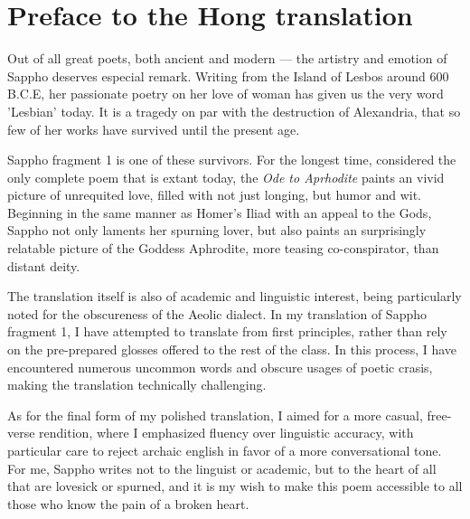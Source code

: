 \section*{Preface to the Hong translation}
Out of all great poets, both ancient and modern --- the artistry and emotion of Sappho deserves especial remark. Writing from the Island of Lesbos around 600 B.C.E, her passionate poetry on her love of woman has given us the very word 'Lesbian' today. It is a tragedy on par with the destruction of Alexandria, that so few of her works have survived until the present age.

Sappho fragment 1 is one of these survivors. For the longest time, considered the only complete poem that is extant today, the \emph{Ode to Aprhodite} paints an vivid picture of unrequited love, filled with not just longing, but humor and wit. Beginning in the same manner as Homer's Iliad with an appeal to the Gods, Sappho not only laments her spurning lover, but also paints an surprisingly relatable picture of the Goddess Aphrodite, more teasing co-conspirator, than distant deity.

The translation itself is also of academic and linguistic interest, being particularly noted for the obscureness of the Aeolic dialect. In my translation of Sappho fragment 1, I have attempted to translate from first principles, rather than rely on the pre-prepared glosses offered to the rest of the class. In this process, I have encountered numerous uncommon words and obscure usages of poetic crasis, making the translation technically challenging.

As for the final form of my polished translation, I aimed for a more casual, free-verse rendition, where I emphasized fluency over linguistic accuracy, with particular care to reject archaic english in favor of a more conversational tone. For me, Sappho writes not to the linguist or academic, but to the heart of all that are lovesick or spurned, and it is my wish to make this poem accessible to all those who know the pain of a broken heart.

